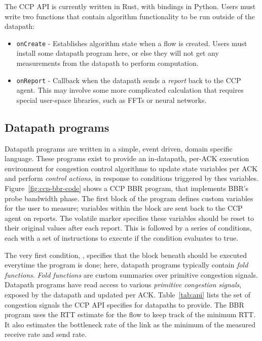 The CCP API is currently written in Rust, with bindings in Python.
Users must write two functions that contain algorithm functionality to be run outside of the datapath:
  \begin{itemize}
    \item \texttt{onCreate} - Establishes algorithm state when a flow is created. Users must install some datapath program here, or else they will not get any measurements from the datapath to perform computation.
    \item \texttt{onReport} - Callback when the datapath sends a \textit{report} back to the CCP agent. This may involve some more complicated calculation that requires special user-space libraries, such as FFTs or neural networks.
  \end{itemize}

\subsection{Datapath programs}
Datapath programs are written in a simple, event driven, domain specific language.
These programs exist to provide an in-datapath, per-ACK execution environment for congestion control algorithms to update state variables per ACK and perform \textit{control actions}, in response to conditions triggered by thes variables.
Figure~\ref{fig:ccp-bbr-code} shows a CCP BBR program, that implements BBR's probe bandwidth phase.
The first block of the program defines custom variables for the user to measure; variables within the  block are sent back to the CCP agent on reports.
The volatile marker specifies these variables should be reset to their original values after each report.
This is followed by a series of conditions, each with a set of instructions to execute if the condition evaluates to true.

The very first condition, , specifies that the block beneath should be executed everytime the program is done; here, datapath programs typically contain \textit{fold functions}.
\textit{Fold functions} are custom summaries over primitive congestion signals.
Datapath programs have read access to various \textit{primitive congestion signals}, exposed by the datapath and updated per ACK.
Table~\ref{tab:api} lists the set of congestion signals the CCP API specifies for datapaths to provide.
The BBR program uses the RTT estimate for the flow to keep track of the minimum RTT.
It also estimates the bottleneck rate of the link as the minimum of the measured receive rate and send rate.

